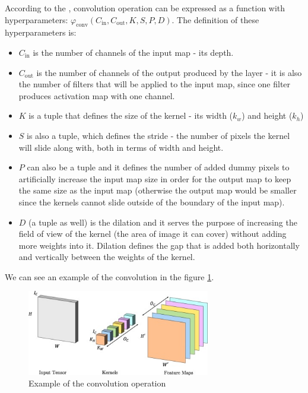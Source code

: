 According to the \cite{Santosh2022-2}, convolution operation can be expressed as a function with hyperparameters: $\varphi_{\text{conv}}(C_{\text{in}}, C_{\text{out}}, K, S, P, D)$. The definition of these hyperparameters is:

\begin{itemize}
    \item $C_{\text{in}}$ is the number of channels of the input map - its depth.
    \item $C_{\text{out}}$ is the number of channels of the output produced by the layer - it is also the number of filters that will be applied to the input map, since one filter produces activation map with one channel.
    \item $K$ is a tuple that defines the size of the kernel - its width ($k_w$) and height ($k_h$)
    \item $S$ is also a tuple, which defines the stride - the number of pixels the kernel will slide along with, both in terms of width and height.
    \item $P$ can also be a tuple and it defines the number of added dummy pixels to artificially increase the input map size in order for the output map to keep the same size as the input map (otherwise the output map would be smaller since the kernels cannot slide outside of the boundary of the input map).
    \item $D$ (a tuple as well) is the dilation and it serves the purpose of increasing the field of view of the kernel (the area of image it can cover) without adding more weights into it. Dilation defines the gap that is added both horizontally and vertically between the weights of the kernel.
\end{itemize}

We can see an example of the convolution in the figure \ref{fig:convolution}.

\begin{figure}[H]
\begin{centering}
\includegraphics[width=8cm]{assets/images/conv.jpg}
\par\end{centering}
\caption{Example of the convolution operation \cite{Santosh2022-2}}
\label{fig:convolution}
\end{figure}

